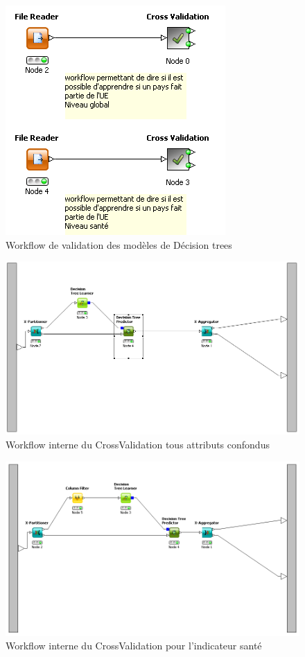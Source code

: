 \begin{figure}[H]
	\begin{center}
		\includegraphics[scale=0.5]{Image/workflowValidation}
		\caption{Workflow de validation des modèles de Décision trees}
	\end{center}
\end{figure}
\begin{figure}[H]
	\begin{center}
		\includegraphics[scale=0.5]{Image/WorklowCrossValidationGlobal}
		\caption{Workflow interne du CrossValidation tous attributs confondus}
	\end{center}
\end{figure}
\begin{figure}[H]
	\begin{center}
		\includegraphics[scale=0.5]{Image/workflowValidatationSante}
		\caption{Workflow interne du CrossValidation pour l'indicateur santé}
	\end{center}
\end{figure}

